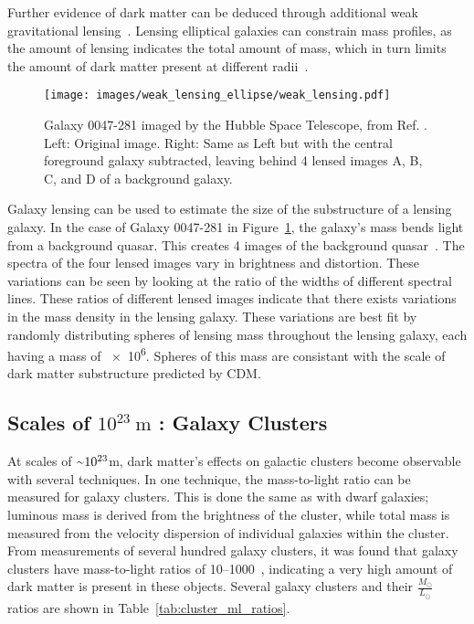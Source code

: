 Further evidence of dark matter can be deduced through additional weak gravitational lensing~\cite{weak_lensing_2001}.
Lensing elliptical galaxies can constrain mass profiles, as the amount of lensing indicates the total amount of mass, which in turn limits the amount of dark matter present at different radii~\cite{weak_lensing_ellipse}.

\begin{figure}
  \centering
  \texttt{[image: images/weak\_lensing\_ellipse/weak\_lensing.pdf]}
  \caption[Weak Lensing with an Ellipse Galaxy]{
    Galaxy 0047-281 imaged by the Hubble Space Telescope, from Ref. \cite{weak_lensing_ellipse}.
    Left: Original image.
    Right: Same as Left but with the central foreground galaxy subtracted, leaving behind 4 lensed images A, B, C, and D of a background galaxy.
  }
  \label{fig:ellipse}
\end{figure}
    
Galaxy lensing can be used to estimate the size of the substructure of a lensing galaxy.
In the case of Galaxy 0047-281 in Figure~\ref{fig:ellipse}, the galaxy's mass bends light from a background quasar.
This creates 4 images of the background quasar~\cite{weak_lensing_quasar}.
The spectra of the four lensed images vary in brightness and distortion.
These variations can be seen by looking at the ratio of the widths of different spectral lines.
These ratios of different lensed images indicate that there exists variations in the mass density in the lensing galaxy.
These variations are best fit by randomly distributing spheres of lensing mass throughout the lensing galaxy, each having a mass of \SI{e6}{\Msol}.
Spheres of this mass are consistant with the scale of dark matter substructure predicted by CDM.

\subsection{Scales of $10^{23}\:\text{m}$ : Galaxy Clusters}\label{dm_galclusters}
%
At scales of $\nicetilde 10^{23}$m, dark matter's effects on galactic clusters become observable with several techniques.
In one technique, the mass-to-light ratio can be measured for galaxy clusters.
This is done the same as with dwarf galaxies; luminous mass is derived from the brightness of the cluster, while total mass is measured from the velocity dispersion of individual galaxies within the cluster.
From measurements of several hundred galaxy clusters, it was found that galaxy clusters have mass-to-light ratios of \SIrange{10}{1000}{}~\cite{cluster_ml_ratios}, indicating a very high amount of dark matter is present in these objects.
Several galaxy clusters and their $\frac{M_\odot}{L_\odot}$ ratios are shown in Table~\ref{tab:cluster_ml_ratios}.

